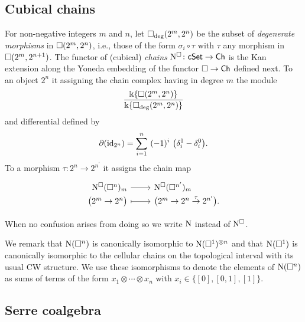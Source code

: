 \subsection{Cubical chains}

For non-negative integers $m$ and $n$, let $\square_{\deg}(2^m, 2^n)$ be the subset of \textit{degenerate morphisms} in $\square(2^m, 2^n)$, i.e., those of the form $\sigma_i \circ \tau$ with $\tau$ any morphism in $\square(2^m, 2^{n+1})$.
The functor of (cubical) \textit{chains} $\operatorname{N^{\square}} \colon \mathsf{cSet} \to \mathsf{Ch}$ is the Kan extension along the Yoneda embedding of the functor $\square \to \mathsf{Ch}$ defined next.
To an object $2^n$ it assigning the chain complex having in degree $m$ the module
\begin{equation*}
\frac{\Bbbk\{\square(2^m, 2^n)\}}{\Bbbk\{\square_{\deg}(2^m, 2^n)\}}
\end{equation*}
and differential defined by
\begin{equation*}
\partial (\id_{2^n}) = \sum_{i=1}^{n} \ (-1)^i \
\big(\delta_i^1 - \delta_i^0 \big).
\end{equation*}
To a morphism $\tau \colon 2^n \to 2^{n^\prime}$ it assigns the chain map
\begin{equation*}
\begin{tikzcd}[row sep=-3pt, column sep=normal,
/tikz/column 1/.append style={anchor=base east},
/tikz/column 2/.append style={anchor=base west}]
\cchains(\cube^n)_m \arrow[r] &  \cchains(\cube^{n^\prime})_m \\
\big( 2^m \to 2^n \big) \arrow[r, mapsto] & \big( 2^m \to 2^n \stackrel{\tau}{\to} 2^{n^\prime} \big).
\end{tikzcd}
\end{equation*}

When no confusion arises from doing so we write $\operatorname{N}$ instead of $\operatorname{N^{\square}}$.

We remark that $\operatorname{N}(\square^n)$ is canonically isomorphic to $\operatorname{N}(\square^1)^{\otimes n}$ and that $\operatorname{N}(\square^1)$ is canonically isomorphic to the cellular chains on the topological interval with its usual CW structure.
We use these isomorphisms to denote the elements of $\operatorname{N}(\square^n)$ as sums of terms of the form $x_1 \otimes \cdots \otimes x_n$ with $x_i \in \big\{[0], [0,1], [1] \big\}$.

\subsection{Serre coalgebra} \label{ss:serre coalgebra}

